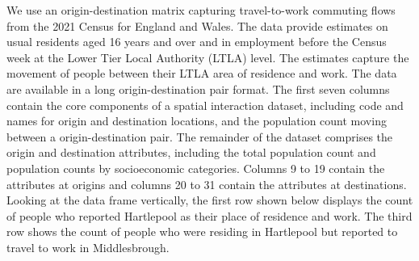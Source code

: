 \documentclass[
  a4paper, 
  twoside,
  final
]{article}
\newcounter{code}
\begin{document}
We use an origin-destination matrix capturing travel-to-work commuting
flows from the 2021 Census for England and Wales. The data provide
estimates on usual residents aged 16 years and over and in employment
before the Census week at the Lower Tier Local Authority (LTLA) level.
The estimates capture the movement of people between their LTLA area of
residence and work. The data are available in a long origin-destination
pair format. The first seven columns contain the core components of a
spatial interaction dataset, including code and names for origin and
destination locations, and the population count moving between a
origin-destination pair. The remainder of the dataset comprises the
origin and destination attributes, including the total population count
and population counts by socioeconomic categories. Columns 9 to 19
contain the attributes at origins and columns 20 to 31 contain the
attributes at destinations. Looking at the data frame vertically, the
first row shown below displays the count of people who reported
Hartlepool as their place of residence and work. The third row shows the
count of people who were residing in Hartlepool but reported to travel
to work in Middlesbrough.
\end{document}
